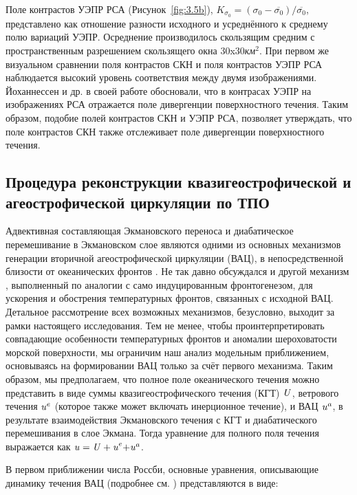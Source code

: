 Поле контрастов УЭПР РСА (Рисунок~\ref{fig:3.5b}), $K_{\sigma _{0} } =(\sigma _{0} -\overline{\sigma _{0} })/\overline{\sigma _{0} }$, представлено как отношение разности исходного и усреднённого к среднему полю вариаций УЭПР. Осреднение производилось скользящим средним с пространственным разрешением скользящего окна 30x30\textit{км${}^2$}. При первом же визуальном сравнении поля контрастов СКН и поля контрастов УЭПР РСА наблюдается высокий уровень соответствия между двумя изображениями. Йоханнессен и др. в своей работе \citep{Johannessen2005} обосновали, что в контрасах УЭПР на изображениях РСА отражается поле дивергенции поверхностного течения. Таким образом, подобие полей контрастов СКН и УЭПР РСА, позволяет утверждать, что поле контрастов СКН также отслеживает поле дивергенции поверхностного течения.



\subsection{Процедура реконструкции квазигеострофической и агеострофической циркуляции по ТПО} \label{sec:3.2.2}


Адвективная составляющая Экмановского переноса и диабатическое перемешивание в Экмановском слое являются одними из основных механизмов генерации вторичной агеострофической циркуляции (ВАЦ), в непосредственной близости от океанических фронтов \citep{Klein1990,Garrett1981,Thompson2000,Nagai2006}. Не так давно обсуждался и другой механизм \citep{McWilliams2009}, выполненный по аналогии с само индуцированным фронтогенезом, для ускорения и обострения температурных фронтов, связанных с исходной ВАЦ. Детальное рассмотрение всех возможных механизмов, безусловно, выходит за рамки настоящего исследования. Тем не менее, чтобы проинтерпретировать совпадающие особенности температурных фронтов и аномалии шероховатости морской поверхности, мы ограничим наш анализ модельным приближением, основываясь на формировании ВАЦ только за счёт первого механизма. Таким образом, мы предполагаем, что полное поле океанического течения можно представить в виде суммы квазигеострофического течения (КГТ) ${\it U}$, ветрового течения ${\it u}^{e} $ (которое также может включать инерционное течение), и ВАЦ ${\it u}^{a} $, в результате взаимодействия Экмановского течения с КГТ и диабатического перемешивания в слое Экмана. Тогда уравнение для полного поля течения выражается как ${\it u=U+u}^{e} {\it +u}^{a} $.

В первом приближении числа Россби, основные уравнения, описывающие динамику течения ВАЦ (подробнее см. \citep{Klein1990,Garrett1981,Thompson2000,Nagai2006}) представляются в виде:



